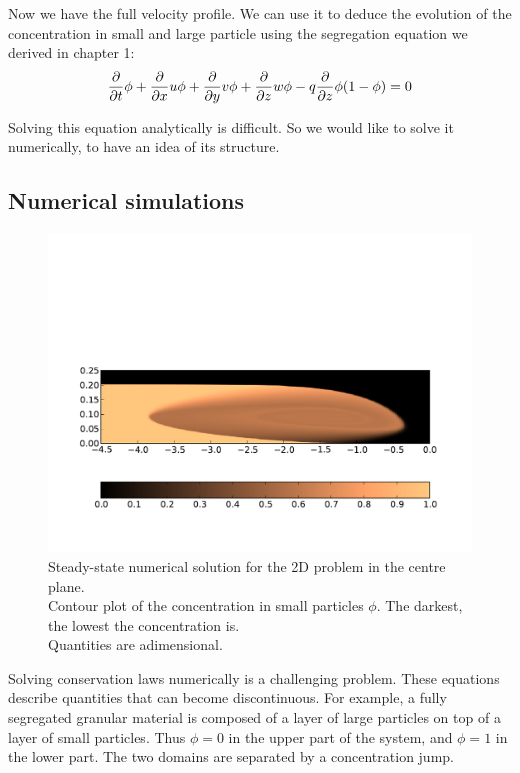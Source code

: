 Now we have the full velocity profile. We can use it to deduce the evolution of the concentration in small and large particle using the segregation equation we derived in chapter 1:
\begin{equation}
	\frac{\partial {}}{\partial {t}} \phi + \frac{\partial {}}{\partial {x}} u \phi + \frac{\partial {}}{\partial {y}} v \phi + \frac{\partial {}}{\partial {z}} w \phi - q \frac{\partial {}}{\partial {z}} \phi( 1 - \phi) = 0
\end{equation}

Solving this equation analytically is difficult. So we would like to solve it numerically, to have an idea of its structure.

\subsection{Numerical simulations}

\begin{figure}[htp]
\begin{center}
\includegraphics[scale=0.7]{vector/spiral.pdf} 
\end{center}
\caption{Steady-state numerical solution for the 2D problem in the centre plane. \\
Contour plot of the concentration in small particles $\phi$. The darkest, the lowest the concentration is. \\
Quantities are adimensional.}
\label{fig:2D}
\end{figure}

Solving conservation laws numerically is a challenging problem. 
These equations describe quantities that can become discontinuous. For example, a fully segregated granular material is composed of a layer of large particles on top of a layer of small particles. Thus $\phi = 0$ in the upper part of the system, and $\phi = 1$ in the lower part. The two domains are separated by a concentration jump.

